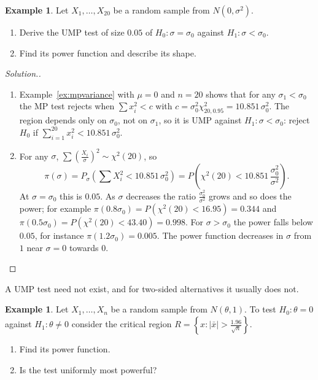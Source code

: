 \documentclass[12pt,a4paper]{report}
\theoremstyle{definition}
\newtheorem{example}[thm]{Example}
\theoremstyle{plain}
\newenvironment{solution}
  {\renewcommand{\qedsymbol}{}\begin{proof}[\textit{Solution}.]}
  {\end{proof}}
\begin{document}
\begin{example}
\label{ex:umpvariance}
Let $X_1,\dots,X_{20}$ be a random sample from $N(0,\sigma^2)$.
\begin{enumerate}
\item[(a)] Derive the UMP test of size $0.05$ of $H_0\colon\sigma = \sigma_0$
against $H_1\colon\sigma<\sigma_0$.
\item[(b)] Find its power function and describe its shape.
\end{enumerate}
\end{example}

\begin{solution}
\begin{enumerate}
\item[(a)] Example~\ref{ex:mpvariance} with $\mu = 0$ and $n = 20$ shows that for
any $\sigma_1<\sigma_0$ the MP test rejects when $\sum x_i^2<c$ with
$c = \sigma_0^2\chi^2_{20,0.95} = 10.851\,\sigma_0^2$. The region depends only on
$\sigma_0$, not on $\sigma_1$, so it is UMP against $H_1\colon\sigma<\sigma_0$:
reject $H_0$ if $\sum_{i=1}^{20} x_i^2<10.851\,\sigma_0^2$.
\item[(b)] For any $\sigma$, $\sum\left(\frac{X_i}{\sigma}\right)^2\sim\chi^2(20)$,
so
\[\pi(\sigma) = P_\sigma\left(\sum X_i^2<10.851\,\sigma_0^2\right)
= P\left(\chi^2(20)<10.851\,\frac{\sigma_0^2}{\sigma^2}\right).\]
At $\sigma = \sigma_0$ this is $0.05$. As $\sigma$ decreases the ratio
$\frac{\sigma_0^2}{\sigma^2}$ grows and so does the power; for example
$\pi(0.8\sigma_0) = P(\chi^2(20)<16.95) = 0.344$ and
$\pi(0.5\sigma_0) = P(\chi^2(20)<43.40) = 0.998$. For $\sigma>\sigma_0$ the power
falls below $0.05$, for instance $\pi(1.2\sigma_0) = 0.005$. The power function
decreases in $\sigma$ from $1$ near $\sigma = 0$ towards $0$.
\end{enumerate}
\end{solution}

A UMP test need not exist, and for two-sided alternatives it usually does not.

\begin{example}
\label{ex:noump}
Let $X_1,\dots,X_n$ be a random sample from $N(\theta,1)$. To test
$H_0\colon\theta = 0$ against $H_1\colon\theta\ne 0$ consider the critical region
$R = \left\{x : |\bar x|>\frac{1.96}{\sqrt n}\right\}$.
\begin{enumerate}
\item[(a)] Find its power function.
\item[(b)] Is the test uniformly most powerful?
\end{enumerate}
\end{example}
\end{document}
